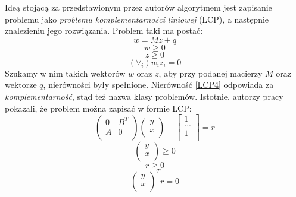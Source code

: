 \documentclass[polish]{standalone}
\begin{document}
Ideą stojącą za przedstawionym przez autorów algorytmem jest zapisanie problemu jako \textit{problemu komplementarności
liniowej} (LCP), a następnie znalezieniu jego rozwiązania. Problem taki ma postać:
\begin{equation}
w = M z + q \label{LCP1}
\end{equation}
\begin{equation}
w \geq 0 \label{LCP2}
\end{equation}
\begin{equation}
z \geq 0 \label{LCP3}
\end{equation}
\begin{equation}
(\forall_i) w_i z_i = 0 \label{LCP4}
\end{equation}
Szukamy w nim takich wektorów $w$ oraz $z$, aby przy podanej macierzy $M$ oraz wektorze $q$, nierówności były spełnione.
Nierówność \ref{LCP4} odpowiada za \textit{komplementarność}, stąd też nazwa klasy problemów. Istotnie, autorzy pracy
pokazali, że problem można zapisać w formie LCP:
\begin{equation}
\begin{pmatrix}
0 & B^T \\
A & 0 \\
\end{pmatrix}
\begin{pmatrix}
y \\
x \\
\end{pmatrix}
-
\begin{bmatrix}
1  \\
...\\
1  \\
\end{bmatrix}
= r
\label{LHb1}
\end{equation}
\begin{equation}
\begin{pmatrix}
y \\
x \\
\end{pmatrix}
\geq 0 \label{LHb2}
\end{equation}
\begin{equation}
r \geq 0 \label{LHb3}
\end{equation}
\begin{equation}
\begin{pmatrix}
y \\
x \\
\end{pmatrix}^T
r
 = 0 \label{LHb4}
\end{equation}
\end{document}
